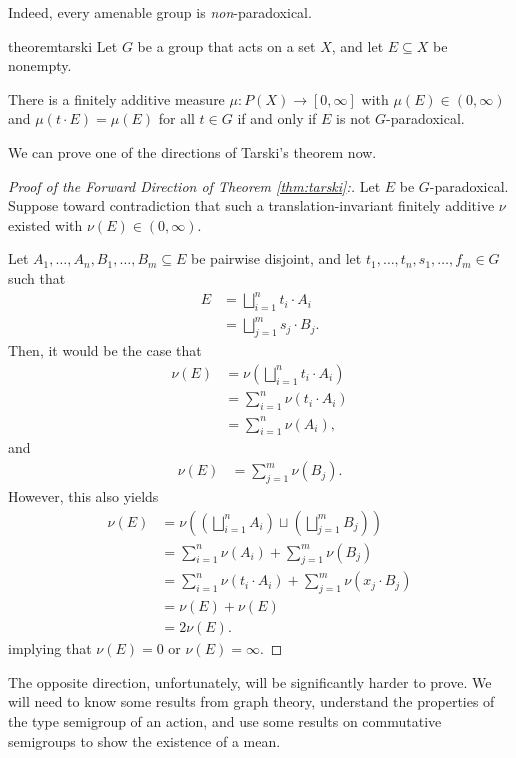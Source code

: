 \documentclass[10pt]{mypackage2}
\begin{document}
Indeed, every amenable group is \textit{non}-paradoxical.
\begin{restatable}{theorem}{tarski}
  Let $G$ be a group that acts on a set $X$, and let $E \subseteq X$ be nonempty.\newline

  There is a finitely additive measure $\mu \colon P(X) \to [0, \infty]$ with $\mu(E) \in (0, \infty)$ and $\mu\left( t\cdot E \right) = \mu(E)$ for all $t\in G$ if and only if $E$ is not $G$-paradoxical.
\label{thm:tarski}
\end{restatable}
We can prove one of the directions of Tarski's theorem now.
\begin{proof}[Proof of the Forward Direction of Theorem \ref{thm:tarski}:]
  Let $E$ be $G$-paradoxical. Suppose toward contradiction that such a translation-invariant finitely additive $\nu$ existed with $\nu(E) \in (0,\infty)$.\newline

  Let $A_1,\dots,A_n,B_1,\dots,B_m\subseteq E$ be pairwise disjoint, and let $t_1,\dots,t_n,s_1,\dots,f_m\in G$ such that
  \begin{align*}
    E &= \bigsqcup_{i=1}^{n}t_i\cdot A_i\\
      &= \bigsqcup_{j=1}^{m}s_j\cdot B_j.
  \end{align*}
  Then, it would be the case that
  \begin{align*}
    \nu(E) &= \nu\left(\bigsqcup_{i=1}^{n}t_i\cdot A_i\right)\\
           &= \sum_{i=1}^{n}\nu\left(t_i\cdot A_i\right)\\
           &= \sum_{i=1}^{n}\nu\left(A_i\right),
  \end{align*}
  and
  \begin{align*}
    \nu(E) &= \sum_{j=1}^{m}\nu\left(B_j\right).
  \end{align*}
  However, this also yields
  \begin{align*}
    \nu\left(E\right) &= \nu\left(\left(\bigsqcup_{i=1}^{n}A_i\right)\sqcup \left(\bigsqcup_{j=1}^{m}B_j\right)\right)\\
                      &= \sum_{i=1}^{n}\nu\left(A_i\right) + \sum_{j=1}^{m}\nu\left(B_j\right)\\
                      &= \sum_{i=1}^{n}\nu\left(t_i\cdot A_i\right) + \sum_{j=1}^{m}\nu\left(x_j\cdot B_j\right)\\
                      &= \nu\left(E\right) + \nu\left(E\right)\\
                      &= 2\nu\left(E\right).
  \end{align*}
  implying that $\nu(E) = 0$ or $\nu(E) = \infty$.
\end{proof}
The opposite direction, unfortunately, will be significantly harder to prove. We will need to know some results from graph theory, understand the properties of the type semigroup of an action, and use some results on commutative semigroups to show the existence of a mean.
\end{document}
